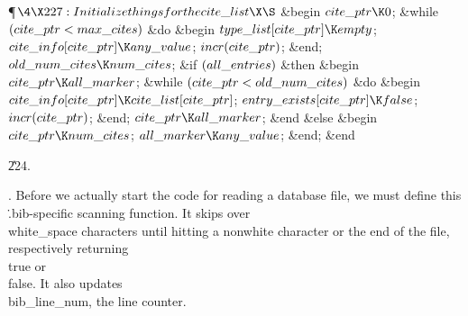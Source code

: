 \Y\P$\4\X227:Initialize things for the \\{cite\_list}\X\S$\6
\&{begin} $\\{cite\_ptr}\K0$;\6
\&{while} $(\\{cite\_ptr}<\\{max\_cites})$ \1\&{do}\6
\&{begin} $\\{type\_list}[\\{cite\_ptr}]\K\\{empty}$;\6
$\\{cite\_info}[\\{cite\_ptr}]\K\\{any\_value}$;\6
$\\{incr}(\\{cite\_ptr})$;\6
\&{end};\2\6
$\\{old\_num\_cites}\K\\{num\_cites}$;\6
\&{if} $(\\{all\_entries})$ \1\&{then}\6
\&{begin} $\\{cite\_ptr}\K\\{all\_marker}$;\6
\&{while} $(\\{cite\_ptr}<\\{old\_num\_cites})$ \1\&{do}\6
\&{begin} $\\{cite\_info}[\\{cite\_ptr}]\K\\{cite\_list}[\\{cite\_ptr}]$;\5
$\\{entry\_exists}[\\{cite\_ptr}]\K\\{false}$;\5
$\\{incr}(\\{cite\_ptr})$;\6
\&{end};\2\6
$\\{cite\_ptr}\K\\{all\_marker}$;\6
\&{end}\6
\4\&{else} \&{begin} $\\{cite\_ptr}\K\\{num\_cites}$;\6
$\\{all\_marker}\K\\{any\_value}$;\6
\&{end};\2\6
\&{end}\par
\U224.\fi

.
Before we actually start the code for reading a database file, we must
define this \.{.bib}-specific scanning function.  It skips over
\\{white\_space} characters until hitting a nonwhite character or the end
of the file, respectively returning \\{true} or \\{false}.  It also
updates \\{bib\_line\_num}, the line counter.

